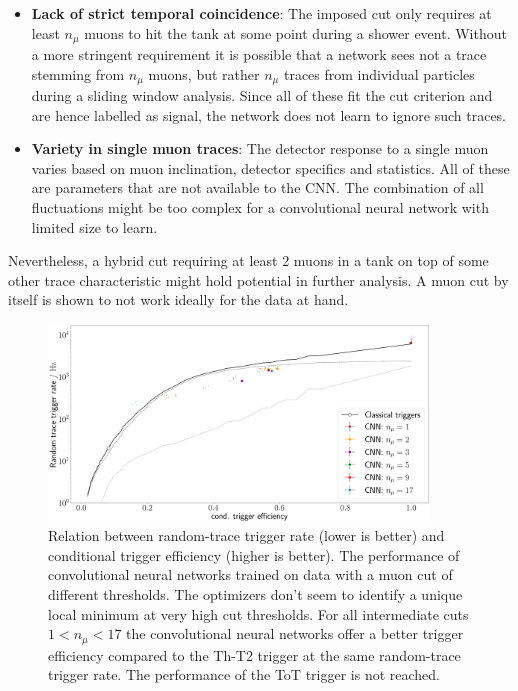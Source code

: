 \begin{itemize}
	\item \textbf{Lack of strict temporal coincidence}: The imposed cut only requires at least $n_\mu$ muons to hit the tank at some point during a shower event. 
	Without a more stringent requirement it is possible that a network sees not a trace stemming from $n_\mu$ muons, but rather $n_\mu$ traces from 
	individual particles during a sliding window analysis. Since all of these fit the cut criterion and are hence labelled as signal, the network does not learn
	to ignore such traces.
	\item \textbf{Variety in single muon traces}: The detector response to a single muon varies based on muon inclination, detector specifics and statistics. All
	of these are parameters that are not available to the CNN. The combination of all fluctuations might be too complex for a convolutional neural network with 
	limited size to learn.
\end{itemize}

Nevertheless, a hybrid cut requiring at least 2 muons in a tank on top of some other trace characteristic might hold potential in further analysis. A muon cut by
itself is shown to not work ideally for the data at hand.

\begin{figure}
	\centering
	\includegraphics[width=0.9\textwidth]{./plots/CNN_muon_cut.png}
	\caption{Relation between random-trace trigger rate (lower is better) and conditional trigger efficiency (higher is better). The performance of convolutional 
	neural networks trained on data with a muon cut of different thresholds. The optimizers don't seem to identify a unique local minimum at very high cut 
	thresholds. For all intermediate cuts $1 < n_\mu < 17$ the convolutional neural networks offer a better trigger efficiency compared to the Th-T2 trigger at the
	same random-trace trigger rate. The performance of the ToT trigger is not reached.}
	\label{fig:CNN-muon-cut}
\end{figure}

